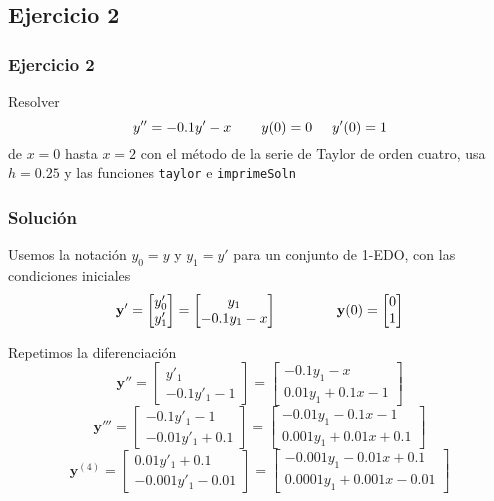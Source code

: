 \subsection{Ejercicio 2}
\begin{frame}
\frametitle{Ejercicio 2}
Resolver
\[ y'' = -0.1 y' - x \hspace{0.75cm} y(0)=0 \hspace{0.5cm} y'(0)=1\]
de $x=0$ hasta $x=2$ con el método de la serie de Taylor de orden cuatro, usa $h=0.25$ y las funciones \texttt{taylor} e \texttt{imprimeSoln}
\end{frame}
\begin{frame}
\frametitle{Solución}
Usemos la notación $y_{0}=y$ y $y_{1}=y'$ para un conjunto de 1-EDO, con las condiciones iniciales
\[\mathbf{y'} = 
\begin{bmatrix}
y'_{0} \\
y'_{1}
\end{bmatrix} =
\begin{bmatrix}
y_{1} \\
-0.1 y_{1} - x
\end{bmatrix}
\hspace{1.5cm}
\mathbf{y}(0) = 
\begin{bmatrix}
0 \\
1
\end{bmatrix} \]
\end{frame}
\begin{frame}
Repetimos la diferenciación
\[ \mathbf{y}'' = 
\begin{bmatrix}
y'_{1} \\
-0.1 y'_{1} -1 
\end{bmatrix} =
\begin{bmatrix}
-0.1 y_{1} - x \\
0.01 y_{1} + 0.1 x -1
\end{bmatrix} \]
\pause
\[ \mathbf{y}''' = 
\begin{bmatrix}
-0.1 y'_{1} -1 \\
-0.01 y'_{1} + 0.1 
\end{bmatrix} =
\begin{bmatrix}
-0.01 y_{1} - 0.1 x - 1\\
0.001 y_{1} + 0.01 x +0.1
\end{bmatrix} \]
\pause
\fontsize{12}{12}\selectfont
\[ \mathbf{y}^{(4)} = 
\begin{bmatrix}
0.01 y'_{1} + 0.1 \\
-0.001 y'_{1} - 0.01 
\end{bmatrix} =
\begin{bmatrix}
-0.001 y_{1} - 0.01x + 0.1 \\
0.0001 y_{1} + 0.001 x -0.01
\end{bmatrix} \]
\end{frame}
